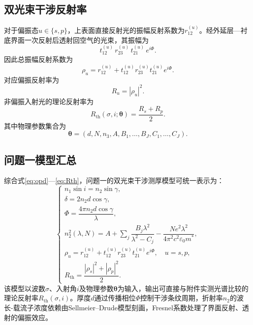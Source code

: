 \documentclass[12pt,a4paper]{ctexart}
\begin{document}
	\subsection{双光束干涉反射率}
	对于偏振态$u\in\{s,p\}$，上表面直接反射光的振幅反射系数为$r_{12}^{(u)}$。经外延层—衬底界面一次反射后透射回空气的光束，其振幅为
	\begin{equation}
		t_{12}^{(u)}\, r_{23}^{(u)}\, t_{21}^{(u)}\, e^{i\Phi}.
	\end{equation}
	因此总振幅反射系数为
	\begin{equation}
		\rho_u = r_{12}^{(u)} + t_{12}^{(u)} r_{23}^{(u)} t_{21}^{(u)} e^{i\Phi}.
		\label{eq:rho_u}
	\end{equation}
	对应偏振反射率为
	\begin{equation}
		R_u = |\rho_u|^2.
	\end{equation}
	非偏振入射光的理论反射率为
	\begin{equation}
		R_{\mathrm{th}}(\sigma,i;\boldsymbol\theta) = \frac{R_s + R_p}{2}.
		\label{eq:Rth}
	\end{equation}
	其中物理参数集合为
	\begin{equation}
		\boldsymbol\theta = (d, N, n_3, A, B_1,\ldots,B_J, C_1,\ldots,C_J).
		\label{eq:theta}
	\end{equation}
	
	\subsection{问题一模型汇总}
	综合式\eqref{eq:opd}—\eqref{eq:Rth}，问题一的双光束干涉测厚模型可统一表示为：
	\begin{equation}
		\begin{cases}
			n_1\sin i = n_2\sin\gamma,\\[2mm]
			\delta = 2n_2 d\cos\gamma,\\[2mm]
			\Phi = \dfrac{4\pi n_2 d\cos\gamma}{\lambda},\\[3mm]
			n_2^2(\lambda,N) = A + \sum_j \dfrac{B_j\lambda^2}{\lambda^2 - C_j}
			- \dfrac{Ne^2\lambda^2}{4\pi^2 c^2 \varepsilon_0 m^*},\\[4mm]
			\rho_u = r_{12}^{(u)} + t_{12}^{(u)} r_{23}^{(u)} t_{21}^{(u)} e^{i\Phi},
			\quad u=s,p,\\[2mm]
			R_{\mathrm{th}} = \dfrac{|\rho_s|^2 + |\rho_p|^2}{2}.
		\end{cases}
		\label{eq:q1_model}
	\end{equation}
	该模型以波数$\sigma$、入射角$i$及物理参数$\boldsymbol\theta$为输入，输出可直接与附件实测光谱比较的理论反射率$R_{\mathrm{th}}(\sigma,i)$。厚度$d$通过传播相位$\Phi$控制干涉条纹周期，折射率$n_2$的波长-载流子浓度依赖由Sellmeier–Drude模型刻画，Fresnel系数处理了界面反射、透射的偏振效应。
	
\end{document}
